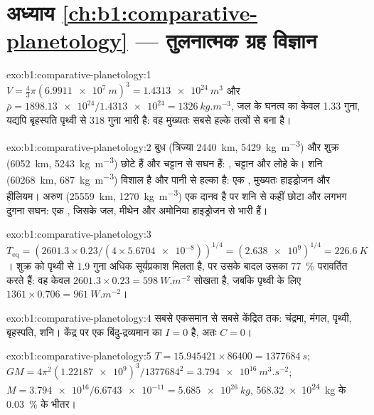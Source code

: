 \section*{अध्याय \ref{ch:b1:comparative-planetology} --- तुलनात्मक ग्रह विज्ञान}

\begin{solution}{exo:b1:comparative-planetology:1}
$V = \tfrac43\pi(\qty{6.9911e7}{m})^3 = \qty{1.4313e24}{m^3}$ और
$\bar\rho = \num{1898.13e24}/\num{1.4313e24} = \qty{1326}{kg.m^{-3}}$, जल के घनत्व का केवल
1.33 गुना, यद्यपि बृहस्पति पृथ्वी से 318 गुना भारी है: वह मुख्यतः सबसे हल्के तत्वों से बना है।
\end{solution}

\begin{solution}{exo:b1:comparative-planetology:2}
बुध (त्रिज्या \qty{2440}{km}, \qty{5429}{kg.m^{-3}}) और शुक्र
(\qty{6052}{km}, \qty{5243}{kg.m^{-3}}) छोटे हैं और चट्टान से सघन हैं: , चट्टान और लोहे
के। शनि (\qty{60268}{km}, \qty{687}{kg.m^{-3}}) विशाल है और पानी से हल्का है: एक , मुख्यतः
हाइड्रोजन और हीलियम। अरुण (\qty{25559}{km}, \qty{1270}{kg.m^{-3}}) एक दानव है पर शनि से कहीं छोटा
और लगभग दुगना सघन: एक , जिसके जल, मीथेन और अमोनिया हाइड्रोजन से भारी हैं।
\end{solution}

\begin{solution}{exo:b1:comparative-planetology:3}
$T_\mathrm{eq} = (2601.3\times0.23/(4\times\num{5.6704e-8}))^{1/4} =
(\num{2.638e9})^{1/4} = \qty{226.6}{K}$। शुक्र को पृथ्वी से 1.9 गुना अधिक सूर्यप्रकाश मिलता है, पर उसके
बादल उसका \qty{77}{\percent} परावर्तित करते हैं: वह केवल $2601.3\times0.23 = \qty{598}{W.m^{-2}}$ सोखता
है, जबकि पृथ्वी के लिए $1361\times0.706 = \qty{961}{W.m^{-2}}$।
\end{solution}

\begin{solution}{exo:b1:comparative-planetology:4}
सबसे एकसमान से सबसे केंद्रित तक: चंद्रमा, मंगल, पृथ्वी, बृहस्पति, शनि। केंद्र पर एक बिंदु-द्रव्यमान का
$I = 0$ है, अतः $C = 0$।
\end{solution}

\begin{solution}{exo:b1:comparative-planetology:5}
$T = 15.945421\times86400 = \qty{1377684}{s}$;
$GM = 4\pi^2(\num{1.22187e9})^3/\num{1377684}^2 = \qty{3.794e16}{m^3.s^{-2}}$;
$M = \num{3.794e16}/\num{6.6743e-11} = \qty{5.685e26}{kg}$, \qty{568.32e24}{kg} के \qty{0.03}{\percent} के भीतर।
\end{solution}

